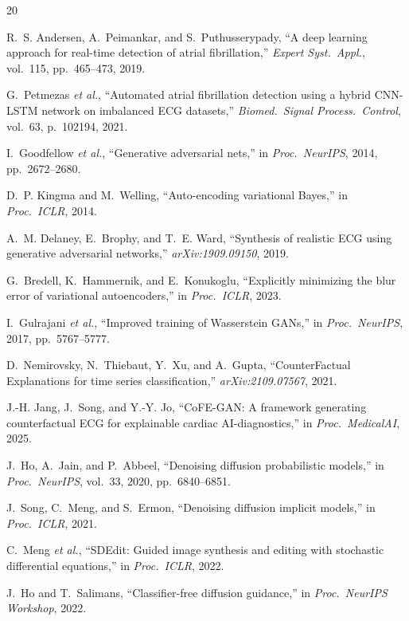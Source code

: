 \documentclass[conference]{IEEEtran}
\begin{document}
\begin{thebibliography}{20}

R.~S. Andersen, A.~Peimankar, and S.~Puthusserypady, ``A deep learning approach for real-time detection of atrial fibrillation,'' \textit{Expert Syst.\ Appl.}, vol.~115, pp.~465--473, 2019.

G.~Petmezas \textit{et al.}, ``Automated atrial fibrillation detection using a hybrid CNN-LSTM network on imbalanced ECG datasets,'' \textit{Biomed.\ Signal Process.\ Control}, vol.~63, p.~102194, 2021.

I.~Goodfellow \textit{et al.}, ``Generative adversarial nets,'' in \textit{Proc.\ NeurIPS}, 2014, pp.~2672--2680.

D.~P. Kingma and M.~Welling, ``Auto-encoding variational Bayes,'' in \textit{Proc.\ ICLR}, 2014.

A.~M. Delaney, E.~Brophy, and T.~E. Ward, ``Synthesis of realistic ECG using generative adversarial networks,'' \textit{arXiv:1909.09150}, 2019.

G.~Bredell, K.~Hammernik, and E.~Konukoglu, ``Explicitly minimizing the blur error of variational autoencoders,'' in \textit{Proc.\ ICLR}, 2023.

I.~Gulrajani \textit{et al.}, ``Improved training of Wasserstein GANs,'' in \textit{Proc.\ NeurIPS}, 2017, pp.~5767--5777.

D.~Nemirovsky, N.~Thiebaut, Y.~Xu, and A.~Gupta, ``CounterFactual Explanations for time series classification,'' \textit{arXiv:2109.07567}, 2021.

J.-H. Jang, J.~Song, and Y.-Y. Jo, ``CoFE-GAN: A framework generating counterfactual ECG for explainable cardiac AI-diagnostics,'' in \textit{Proc.\ MedicalAI}, 2025.

J.~Ho, A.~Jain, and P.~Abbeel, ``Denoising diffusion probabilistic models,'' in \textit{Proc.\ NeurIPS}, vol.~33, 2020, pp.~6840--6851.

J.~Song, C.~Meng, and S.~Ermon, ``Denoising diffusion implicit models,'' in \textit{Proc.\ ICLR}, 2021.

C.~Meng \textit{et al.}, ``SDEdit: Guided image synthesis and editing with stochastic differential equations,'' in \textit{Proc.\ ICLR}, 2022.

J.~Ho and T.~Salimans, ``Classifier-free diffusion guidance,'' in \textit{Proc.\ NeurIPS Workshop}, 2022.


\end{thebibliography}
\end{document}
